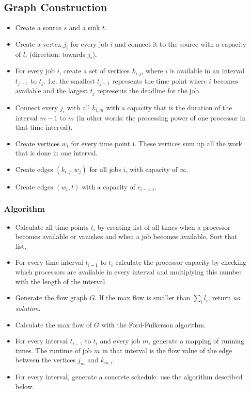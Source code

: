 \documentclass[12pt]{article}
\begin{document}
\subsection*{Graph Construction}
\begin{itemize}
	\item Create a source $s$ and a sink $t$.
	\item Create a vertex $j_i$ for every job $i$ and connect it to the source with a capacity of $l_i$ (direction: towards $j_i$).
	\item For every job $i$, create a set of vertices $k_{i, j}$, where $i$ is available in an interval $t_{j-1}$ to $t_j$. I.e. the smallest $t_{j-1}$ represents the time point where $i$ becomes available and the largest $t_j$ represents the deadline for the job.
	\item Connect every $j_i$ with all $k_{i, m}$ with a capacity that is the duration of the interval $m-1$ to $m$ (in other words: the processing power of one processor in that time interval).
	\item Create vertices $w_i$ for every time point i. These vertices sum up all the work that is done in one interval.
	\item Create edges $(k_{i, j}, w_j)$ for all jobs $i$, with  capacity of $\infty$.
	\item Create edges $(w_i, t)$ with a capacity of $c_{i-1, i}$.
\end{itemize}

\subsubsection*{Algorithm}
\begin{itemize}
	\item Calculate all time points $t_i$ by creating list of all times when a processor becomes available or vanishes and when a job becomes available. Sort that list.
	\item For every time interval $t_{i-1}$ to $t_i$ calculate the processor capacity by checking which processors are available in every interval and multiplying this number with the length of the interval.
	\item Generate the flow graph $G$. If the max flow is smaller than $\sum_i l_i$, return \emph{no solution}.
	\item Calculate the max flow of $G$ with the Ford-Fulkerson algorithm.
	\item For every interval $t_{i-1}$ to $t_i$ and every job $m$, generate a mapping of running times. The runtime of job $m$ in that interval is the flow value of the edge between the vertices $j_m$ and $k_{m,i}$.
	\item For every interval, generate a concrete schedule: use the algorithm described below.
\end{itemize}
\end{document}
